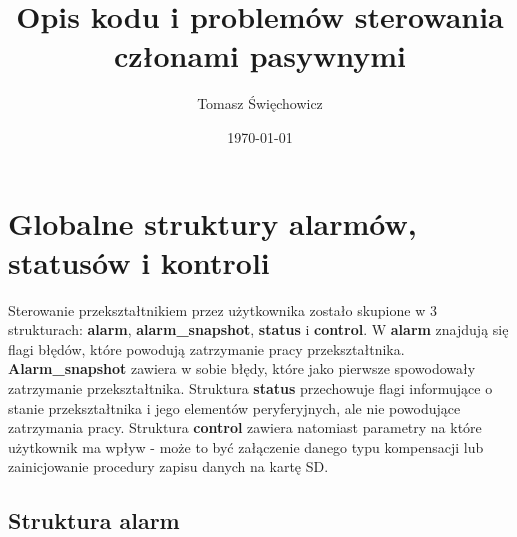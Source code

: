 \documentclass[12pt,a4paper]{article}
\begin{document}
\sloppy
\title{Opis kodu i problemów sterowania członami pasywnymi}
\author{Tomasz Święchowicz}
\date{\today}

\maketitle


\section{Globalne struktury alarmów, statusów i kontroli}
Sterowanie przekształtnikiem przez użytkownika zostało skupione w 3 strukturach: \textbf{alarm}, \textbf{alarm\_snapshot}, \textbf{status} i \textbf{control}. W \textbf{alarm} znajdują się flagi błędów, które powodują zatrzymanie pracy przekształtnika. \textbf{Alarm\_snapshot} zawiera w sobie błędy, które jako pierwsze spowodowały zatrzymanie przekształtnika. Struktura \textbf{status} przechowuje flagi informujące o stanie przekształtnika i jego elementów peryferyjnych, ale nie powodujące zatrzymania pracy. Struktura \textbf{control} zawiera natomiast parametry na które użytkownik ma wpływ - może to być załączenie danego typu kompensacji lub zainicjowanie procedury zapisu danych na kartę SD.

\subsection{Struktura alarm}


\end{document}
